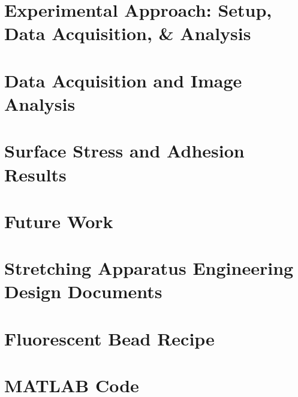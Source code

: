 \documentclass[12pt, oneside]{book}
\begin{document}
\chapter{Experimental Approach: Setup, Data Acquisition, \& Analysis }


\chapter{Data Acquisition and Image Analysis}


\chapter{Surface Stress and Adhesion Results}


\chapter{Future Work}


\appendix 
\chapter[Stretching Apparatus Design]{Stretching Apparatus Engineering Design Documents}


%

\chapter{Fluorescent Bead Recipe}


\chapter{MATLAB Code}



%




\end{document}
